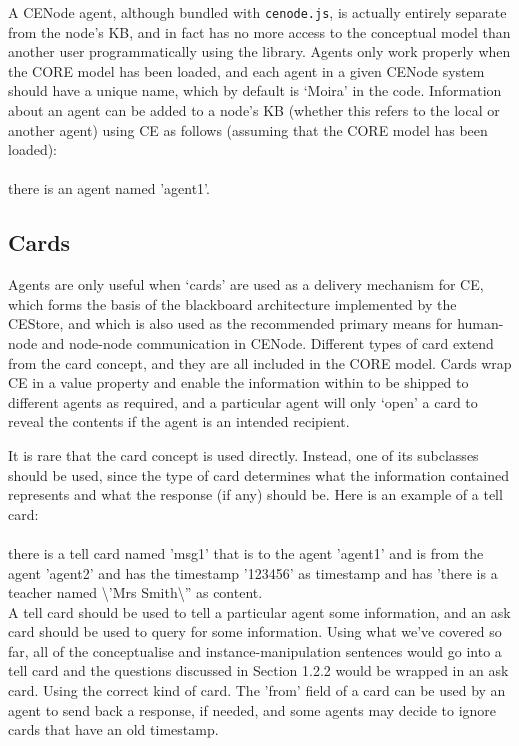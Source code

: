 \documentclass{scrartcl}
\newcommand{\ce}[1]{\textsf{#1}}
\newcommand{\js}[1]{\texttt{#1}}
\begin{document}
A CENode agent, although bundled with \js{cenode.js}, is actually entirely separate from the node's KB, and in fact has no more access to the conceptual model than another user programmatically using the library. Agents only work properly when the CORE model has been loaded, and each agent in a given CENode system should have a unique name, which by default is `Moira' in the code. Information about an agent can be added to a node's KB (whether this refers to the local or another agent) using CE as follows (assuming that the CORE model has been loaded):\\
\\\ce{there is an agent named 'agent1'.}

\subsection{Cards}

Agents are only useful when `cards' are used as a delivery mechanism for CE, which forms the basis of the blackboard architecture implemented by the CEStore, and which is also used as the recommended primary means for human-node and node-node communication in CENode. Different types of card extend from the \ce{card} concept, and they are all included in the CORE model. Cards wrap CE in a value property and enable the information within to be shipped to different agents as required, and a particular agent will only `open' a card to reveal the contents if the agent is an intended recipient. 

It is rare that the \ce{card} concept is used directly. Instead, one of its subclasses should be used, since the type of card determines what the information contained represents and what the response (if any) should be. Here is an example of a \ce{tell card}:\\
\\\ce{there is a tell card named 'msg1' that is to the agent 'agent1' and is from the agent 'agent2' and has the timestamp '123456' as timestamp and has 'there is a teacher named \textbackslash'Mrs Smith\textbackslash'' as content.}\\

A \ce{tell card} should be used to tell a particular agent some information, and an \ce{ask card} should be used to query for some information. Using what we've covered so far, all of the \ce{conceptualise} and instance-manipulation sentences would go into a \ce{tell card} and the questions discussed in Section 1.2.2 would be wrapped in an \ce{ask card}. Using the correct kind of card. The 'from' field of a card can be used by an agent to send back a response, if needed, and some agents may decide to ignore cards that have an old timestamp. 
\end{document}

